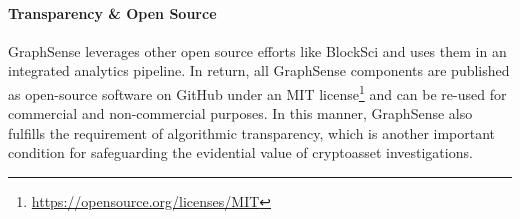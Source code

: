 \paragraph{Transparency \& Open Source} GraphSense leverages other open source efforts like BlockSci and uses them in an integrated analytics pipeline. In return, all GraphSense components are published as open-source software on GitHub under an MIT license\footnote{\url{https://opensource.org/licenses/MIT}} and can be re-used for commercial and non-commercial purposes. In this manner, GraphSense also fulfills the requirement of algorithmic transparency, which is another important condition for safeguarding the evidential value of cryptoasset investigations.
